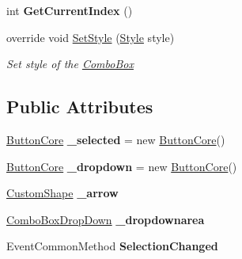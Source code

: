 \begin{DoxyCompactItemize}
\mbox{\label{class_space_v_i_l_1_1_combo_box_ae0ccc820590a58c1c1c568cfcc31a697}} 
int {\bfseries Get\+Current\+Index} ()
\item 
override void \mbox{\hyperlink{class_space_v_i_l_1_1_combo_box_a5aaf1e459ca198f19c8bc4805f5f3b10}{Set\+Style}} (\mbox{\hyperlink{class_space_v_i_l_1_1_decorations_1_1_style}{Style}} style)
\begin{DoxyCompactList}\small\item\em Set style of the \mbox{\hyperlink{class_space_v_i_l_1_1_combo_box}{Combo\+Box}} \end{DoxyCompactList}\end{DoxyCompactItemize}
\subsection*{Public Attributes}
\begin{DoxyCompactItemize}
\item 
\mbox{\label{class_space_v_i_l_1_1_combo_box_adce23de67d14548e8ae0b9785396c562}} 
\mbox{\hyperlink{class_space_v_i_l_1_1_button_core}{Button\+Core}} {\bfseries \+\_\+selected} = new \mbox{\hyperlink{class_space_v_i_l_1_1_button_core}{Button\+Core}}()
\item 
\mbox{\label{class_space_v_i_l_1_1_combo_box_af5f8b3c7272b4db8b4cbd95dcd6120a5}} 
\mbox{\hyperlink{class_space_v_i_l_1_1_button_core}{Button\+Core}} {\bfseries \+\_\+dropdown} = new \mbox{\hyperlink{class_space_v_i_l_1_1_button_core}{Button\+Core}}()
\item 
\mbox{\label{class_space_v_i_l_1_1_combo_box_a2c1391f8845896c3f5299c8e0f8d6586}} 
\mbox{\hyperlink{class_space_v_i_l_1_1_custom_shape}{Custom\+Shape}} {\bfseries \+\_\+arrow}
\item 
\mbox{\label{class_space_v_i_l_1_1_combo_box_a2d664a0828b5fd443165f0d717cd042f}} 
\mbox{\hyperlink{class_space_v_i_l_1_1_combo_box_drop_down}{Combo\+Box\+Drop\+Down}} {\bfseries \+\_\+dropdownarea}
\item 
\mbox{\label{class_space_v_i_l_1_1_combo_box_a157ec5951015e44b3eca71faba5ad8f3}} 
Event\+Common\+Method {\bfseries Selection\+Changed}
\end{DoxyCompactItemize}
